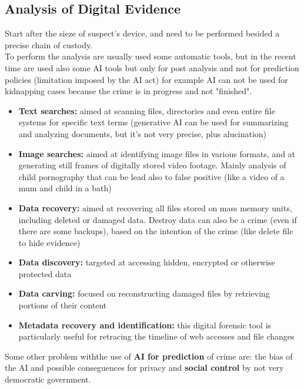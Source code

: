 \subsection{Analysis of Digital Evidence}

Start after the sieze of suspect's device, and need to be performed besided a precise chain of custody. \\ To perform the analysis are usually used some automatic tools, but in the recent time are used also some AI tools but only for post analysis and not for prediction policies (limitation imposed by the AI act) for example AI can not be used for kidnapping cases because the crime is in progress and not "finished".

\begin{itemize}
    \item \textbf{Text searches:} aimed at scanning files, directories and even entire file systems for specific text terms (generative AI can be used for summarizing and analyzing documents, but it's not very precise, plus alucination)
    
    \item \textbf{Image searches:} aimed at identifying image files in various formats, and at generating still frames of digitally stored video footage. Mainly analysis of child pornography that can be lead also to false positive (like a video of a mum and child in a bath)
    
    \item \textbf{Data recovery:} aimed at recovering all files stored on mass memory units, including deleted or damaged data. Destroy data can also be a crime (even if there are some backups), based on the intention of the crime (like delete file to hide evidence) 
    
    \item \textbf{Data discovery:} targeted at accessing hidden, encrypted or otherwise protected data
    
    \item \textbf{Data carving:} focused on reconstructing damaged files by retrieving portions of their content
    
    \item \textbf{Metadata recovery and identification:} this digital forensic tool is particularly useful for retracing the timeline of web accesses and file changes
\end{itemize}

Some other problem withthe use of \textbf{AI for prediction} of crime are: the bias of the AI and possible conseguences for privacy and \textbf{social control} by not very democratic government. 

